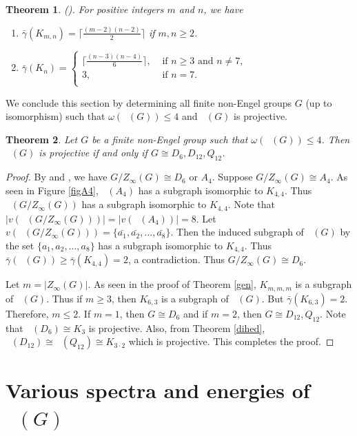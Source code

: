 \documentclass[reqno,12pt]{amsart}
\theoremstyle{plain}
\newtheorem{thm}{Theorem}[section]
\theoremstyle{definition}
\newcommand{\coeng}{\mathop{\mathcal{E}_c^-}}
\begin{document}
\begin{thm} {\rm (\cite{bou, rin}). }
For positive integers $m$ and $n$, we have 
\begin{enumerate}
\item $\bar{\gamma}(K_{m,n})=\lceil \frac{(m-2)(n-2)}{2}  \rceil$ if $m,n \geq 2$.
		
\item $ \bar{\gamma}(K_n)= \begin{cases} 
			\lceil \frac{(n-3)(n-4)}{6} \rceil, & \textrm{ if $n\geq 3$ and $n\neq 7$,} \\
			3, & \textrm{ if $n = 7$.} \\
		\end{cases} $
\end{enumerate}
\end{thm}


We conclude this section by determining all finite non-Engel groups $G$ (up to isomorphism) such that $\omega(\coeng(G))\leq 4$ and $\coeng(G)$ is projective.
\begin{thm} 
Let $G$ be a finite non-Engel group such that $\omega(\coeng(G))\leq 4$. Then $\coeng(G)$ is projective if and only if $G \cong D_6, D_{12},Q_{12}$.
\end{thm}
\begin{proof}
 By \cite[Proposition 1.4]{aa1} and \cite[Theorem 1.2]{aa}, we have $G/Z_\infty(G)\cong D_6$ or $A_4$. Suppose $G/Z_\infty(G)\cong A_4$. As seen in Figure \ref{figA4}, $\coeng(A_4)$ has a subgraph isomorphic to $K_{4,4}$. Thus $\coeng(G/Z_\infty(G))$ has a subgraph isomorphic to $K_{4,4}$. Note that $|v(\coeng(G/Z_\infty(G)))|=|v(\coeng(A_4))|=8$. Let $v(\coeng(G/Z_\infty(G)))=\{\bar{a_1},\bar{a_2},\dots,\bar{a_8}\}$. Then the induced subgraph of $\coeng(G)$ by the set $\{a_1,a_2,\dots,a_8\}$ has a subgraph isomorphic to $K_{4,4}$. Thus $\bar{\gamma}(\coeng(G))\geq \bar{\gamma}(K_{4,4})=2$, a contradiction. Thus $G/Z_\infty(G)\cong D_6$. 

Let $m=|Z_\infty(G)|$. As seen in the proof of Theorem \ref{gen}, $K_{m,m,m}$ is a subgraph of $\coeng(G)$. Thus if $m\geq 3$, then $K_{6,3}$ is a subgraph of $\coeng(G)$. But $\bar{\gamma}(K_{6,3})=2$. Therefore, $m\leq 2$. If $m=1$, then $G\cong D_6$ and if $m=2$, then $G\cong D_{12}, Q_{12}$. Note that $\coeng(D_6) \cong K_3$ 
is projective. Also, from Theorem \ref{dihed}, $\coeng(D_{12})\cong \coeng(Q_{12})\cong K_{3 \cdot 2}$
which is projective. This completes the proof.
\end{proof}


\section{Various spectra and energies of $\coeng(G)$}\label{Energy}
\end{document}
